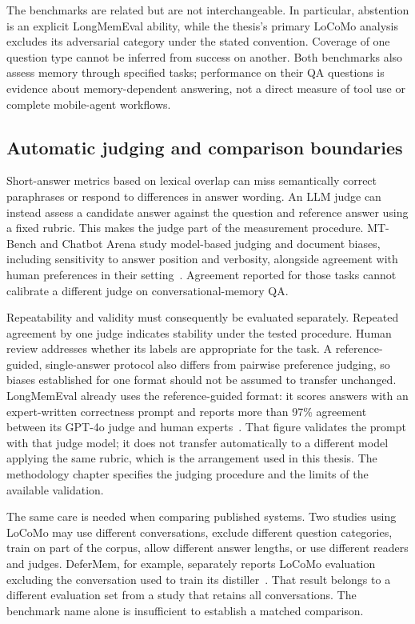 The benchmarks are related but are not interchangeable. In particular, abstention is an
explicit LongMemEval ability, while the thesis's primary LoCoMo analysis excludes its
adversarial category under the stated convention. Coverage of one question type cannot
be inferred from success on another. Both benchmarks also assess memory through specified
tasks; performance on their QA questions is evidence about memory-dependent answering,
not a direct measure of tool use or complete mobile-agent workflows.

\subsection{Automatic judging and comparison boundaries}

Short-answer metrics based on lexical overlap can miss semantically correct paraphrases
or respond to differences in answer wording. An LLM judge can instead assess a candidate
answer against the question and reference answer using a fixed rubric. This makes the
judge part of the measurement procedure. MT-Bench and Chatbot Arena study model-based
judging and document biases, including sensitivity to answer position and verbosity,
alongside agreement with human preferences in their setting~\citep{mtbench}. Agreement
reported for those tasks cannot calibrate a different judge on conversational-memory QA.

Repeatability and validity must consequently be evaluated separately. Repeated agreement
by one judge indicates stability under the tested procedure. Human review addresses
whether its labels are appropriate for the task. A reference-guided, single-answer
protocol also differs from pairwise preference judging, so biases established for one
format should not be assumed to transfer unchanged. LongMemEval already uses the
reference-guided format: it scores answers with an expert-written correctness prompt and
reports more than 97\% agreement between its GPT-4o judge and human
experts~\citep{longmemeval}. That figure validates the prompt with that judge model; it does
not transfer automatically to a different model applying the same rubric, which is the
arrangement used in this thesis. The methodology chapter specifies
the judging procedure and the limits of the available validation.

The same care is needed when comparing published systems. Two studies using LoCoMo may
use different conversations, exclude different question categories, train on part of the
corpus, allow different answer lengths, or use different readers and judges. DeferMem,
for example, separately reports LoCoMo evaluation excluding the conversation used to
train its distiller~\citep{defermem}. That result belongs to a different evaluation set
from a study that retains all conversations. The benchmark name alone is insufficient
to establish a matched comparison.

